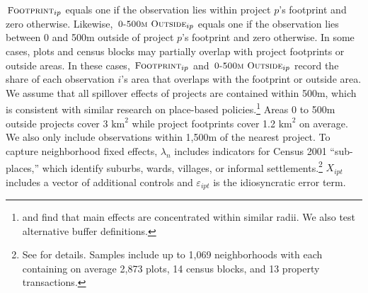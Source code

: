 \documentclass[12pt]{article}
\begin{document}






$\,\textsc{\small Footprint}_{ip}$ equals one if the observation lies within project $p$'s footprint and zero otherwise.  Likewise, $\,\textsc{\small 0-500m Outside}_{ip}$ equals one if the observation lies between 0 and 500m outside of project $p$'s footprint and zero otherwise.  In some cases, plots and census blocks may partially overlap with project footprints or outside areas.  In these cases, $\,\textsc{\small Footprint}_{ip}$ and $\,\textsc{\small 0-500m Outside}_{ip}$ record the share of each observation $i$'s area that overlaps with the footprint or outside area.  We assume that all spillover effects of projects are contained within 500m, which is consistent with similar research on place-based policies.\footnote{\cite{diamond2016wants} and \cite{rossi2010housing} find that main effects are concentrated within similar radii.  We also test alternative buffer definitions.}  Areas 0 to 500m outside projects cover 3 $\text{km}^{2}$ while project footprints cover 1.2 $\text{km}^{2}$ on average.  We also only include observations within 1,500m of the nearest project.  To capture neighborhood fixed effects, $\lambda_{n}$ includes indicators for Census 2001 ``sub-places,'' which identify suburbs, wards, villages, or informal settlements.\footnote{See \cite{censusmeta} for details.  Samples include up to 1,069 neighborhoods with each containing on average 2,873 plots, 14 census blocks, and 13 property transactions.}  $X_{ipt}$ includes a vector of additional controls and $\varepsilon_{ipt}$ is the idiosyncratic error term.  
\end{document}

